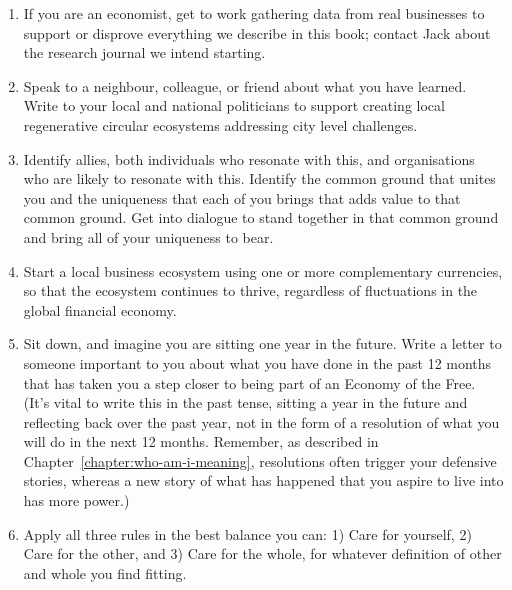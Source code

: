 \begin{enumerate}
\item If you are an economist, get to work gathering data from real businesses to support or disprove everything we describe in this book; contact Jack about the research journal we intend starting. 


\item Speak to a neighbour, colleague, or friend about what you have learned. Write to your local and national politicians to support creating local regenerative circular ecosystems addressing city level challenges. 


\item Identify allies, both individuals who resonate with this, and organisations who are likely to resonate with this. Identify the common ground that unites you and the uniqueness that each of you brings that adds value to that common ground. Get into dialogue to stand together in that common ground and bring all of your uniqueness to bear. 
 
\item Start a local business ecosystem using one or more complementary currencies, so that the ecosystem continues to thrive, regardless of fluctuations in the global financial economy. 


\item Sit down, and imagine you are sitting one year in the future. Write a letter to someone important to you about what you have done in the past 12 months that has taken you a step closer to being part of an Economy of the Free.  (It's vital to write this in the past tense\cite{zander-art}, sitting a year in the future and reflecting back over the past year, not in the form of a resolution of what you will do in the next 12 months. Remember, as described in Chapter~\ref{chapter:who-am-i-meaning}, resolutions often trigger your defensive stories, whereas a new story of what has happened that you aspire to live into has more power.)


\item Apply all three rules in the best balance you can: 1) Care for yourself, 2) Care for the other, and 3) Care for the whole, for whatever definition of other and whole you find fitting.
\end{enumerate}